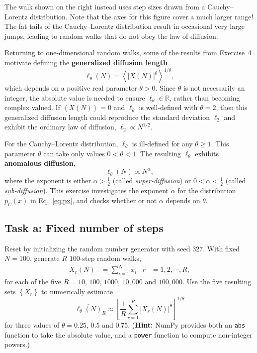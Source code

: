 \documentclass[12 pt]{article} %
\newcommand{\Rbb}{\ensuremath{\mathbb R} }
\newcommand{\al}{\ensuremath{\alpha} }
\newcommand{\vev}[1]{\ensuremath{\left\langle #1 \right\rangle} }
\newcommand{\eq}[1]{Eq.~\ref{#1}}
\begin{document}
The walk shown on the right instead uses step sizes drawn from a Cauchy--Lorentz distribution.
Note that the axes for this figure cover a much larger range!
The fat tails of the Cauchy--Lorentz distribution result in occasional very large jumps, leading to random walks that do not obey the law of diffusion.

Returning to one-dimensional random walks, some of the results from Exercise~4 motivate defining the \textbf{generalized diffusion length}
\begin{equation}
  \label{eq:diff_length}
  \ell_{\theta}(N) = \vev{|X(N)|^{\theta}}^{1 / \theta},
\end{equation}
which depends on a positive real parameter $\theta > 0$.
Since $\theta$ is not necessarily an integer, the absolute value is needed to ensure $\ell_{\theta} \in \Rbb$, rather than becoming complex valued.
If $\vev{X(N)} = 0$ and $\ell_{\theta}$ is well-defined with $\theta = 2$, then this generalized diffusion length could reproduce the standard deviation $\ell_2$ and exhibit the ordinary law of diffusion, $\ell_2 \propto N^{1 / 2}$.

For the Cauchy--Lorentz distribution, $\ell_{\theta}$ is ill-defined for any $\theta \geq 1$.
This parameter $\theta$ can take only values $0 < \theta < 1$.
The resulting $\ell_{\theta}$ exhibits \textbf{anomalous diffusion},
\begin{equation*}
  \ell_{\theta}(N) \propto N^{\al},
\end{equation*}
where the exponent is either $\al > \frac{1}{2}$ (called \textit{super-diffusion}) or $0 < \al < \frac{1}{2}$ (called \textit{sub-diffusion}).
This exercise investigates the exponent \al for the distribution $p_C(x)$ in \eq{eq:px}, and checks whether or not \al depends on $\theta$.

\newpage %
\subsection*{Task a: Fixed number of steps}
Reset by initializing the random number generator with seed $327$.
With fixed $N = 100$, generate $R$ $100$-step random walks,
\begin{align*}
  X_r(N) & = \sum_{i = 1}^N x_i &
  r & = 1, 2, \cdots, R,
\end{align*}
for each of the five $R = 10$, $100$, $1000$, $10{,}000$ and $100{,}000$.
Use the five resulting sets $\left\{X_r\right\}$ to numerically estimate
\begin{equation*}
  \overline{\ell_{\theta}(N)}_R \approx \left[\frac{1}{R} \sum_{r = 1}^R \left|X_r(N)\right|^{\theta}\right]^{1 / \theta}
\end{equation*}
for three values of $\theta = 0.25$, $0.5$ and $0.75$.
(\textbf{Hint:} NumPy provides both an \texttt{abs} function to take the absolute value, and a \texttt{power} function to compute non-integer powers.)
\end{document}
